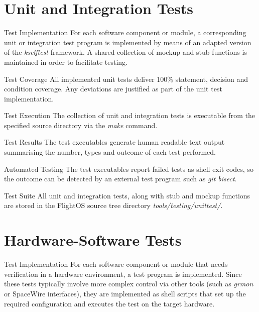 \section{Unit and Integration Tests}

{Test Implementation}{%
For each software component or module, a corresponding unit or integration test
program is implemented by means of an adapted version of the \emph{kselftest}
framework. A shared collection of mockup and stub functions is maintained in
order to facilitate testing.
}%
{}{}

{Test Coverage}{%
All implemented unit tests deliver 100\% statement, decision and condition
coverage. Any deviations are justified as part of the unit test implementation.
}%
{}{}

{Test Execution}{%
The collection of unit and integration tests is executable from the specified
source directory via the \emph{make} command.
}%
{}{}


{Test Results}{%
The test executables generate human readable text output summarising the number,
types and outcome of each test performed.
}%
{}{}


{\hspace{0pt} Automated  Testing}{%
The test executables report failed tests as shell exit codes, so the outcome
can be detected by an external test program such as \emph{git bisect}.
}%
{}{}

{Test Suite}{%
All unit and integration tests, along with stub and mockup functions are stored
in the FlightOS source tree directory \mbox{\emph{tools/testing/unittest/}}.
}%
{}{}



\section{Hardware-Software Tests}

{Test Implementation}{%
For each software component or module that needs verification in a hardware
environment, a test program is implemented.
}%
{}{Since these tests typically involve more complex control %
via other tools (such as \emph{grmon} or \gls{SpaceWire} interfaces), they are %
implemented as shell scripts that set up the required configuration and %
executes the test on the target hardware. %
}


